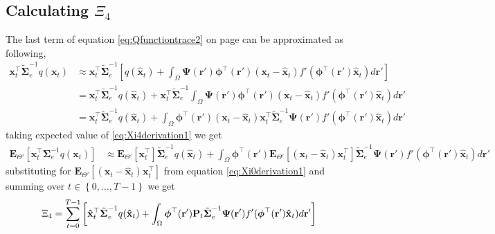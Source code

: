 \documentclass[]{article}
\begin{document}
\subsection*{Calculating $\Xi_{4}$}
The last term of equation \ref{eq:Qfunctiontrace2} on page \pageref{eq:Qfunctiontrace2} can be approximated as following, 
\begin{align}\label{eq:Xi4derivation1}
 \mathbf x_t^\top\tilde{\boldsymbol\Sigma}_e^{-1}q(\mathbf x_t)&\approx\mathbf x_t^\top\tilde{\boldsymbol\Sigma}_e^{-1}\left[q(\mathbf {\hat x}_t)+\int_\Omega \boldsymbol{\Psi}(\mathbf{r}')\boldsymbol \phi^\top(\mathbf r') (\mathbf x_t - \mathbf  {\hat x}_t)f'(\boldsymbol \phi^\top(\mathbf r')\mathbf {\hat x}_t) d\mathbf{r}'\right] \nonumber\\
&=\mathbf x_t^\top\tilde{\boldsymbol\Sigma}_e^{-1}q(\mathbf {\hat x}_t)+\mathbf x_t^\top\tilde{\boldsymbol\Sigma}_e^{-1}\int_\Omega \boldsymbol{\Psi}(\mathbf{r}')\boldsymbol \phi^\top(\mathbf r') (\mathbf x_t - \mathbf  {\hat x}_t)f'(\boldsymbol \phi^\top(\mathbf r')\mathbf {\hat x}_t) d\mathbf{r}' \nonumber \\
&=\mathbf x_t^\top\tilde{\boldsymbol\Sigma}_e^{-1}q(\mathbf {\hat x}_t)+\int_\Omega \boldsymbol \phi^\top(\mathbf r') (\mathbf x_t - \mathbf  {\hat x}_t)\mathbf x_t^\top\tilde{\boldsymbol\Sigma}_e^{-1}\boldsymbol{\Psi}(\mathbf{r}')f'(\boldsymbol \phi^\top(\mathbf r')\mathbf {\hat x}_t) d\mathbf{r}'
\end{align}
taking expected value of \ref{eq:Xi4derivation1} we get
\begin{align}\label{eq:Xi4derivation2}
\mathbf E_{\Theta'}\left[\mathbf x_t^\top\boldsymbol\Sigma_e^{-1}q(\mathbf x_t)\right]&\approx\mathbf E_{\Theta'}\left[\mathbf x_t^\top\right]\tilde{\boldsymbol\Sigma}_e^{-1}q(\mathbf {\hat x}_t)+\int_\Omega \boldsymbol \phi^\top(\mathbf r') \mathbf E_{\Theta'}\left[(\mathbf x_t - \mathbf  {\hat x}_t)\mathbf x_t^\top\right]\tilde{\boldsymbol\Sigma}_e^{-1}\boldsymbol{\Psi}(\mathbf{r}')f'(\boldsymbol \phi^\top(\mathbf r')\mathbf {\hat x}_t) d\mathbf{r}' 
\end{align}
substituting for $\mathbf E_{\Theta'}\left[(\mathbf x_t - \mathbf  {\hat x}_t)\mathbf x_t^\top\right] $ from equation \ref{eq:Xi0derivation1} and summing over $t \in \left\lbrace 0, \dots, T-1\right\rbrace $ we get
\begin{equation}
\Xi_4=\sum_{t=0}^{T-1}\left[\mathbf{ \hat x}_t^\top\tilde{\boldsymbol\Sigma}_e^{-1}q(\mathbf {\hat x}_t)+\int_\Omega \boldsymbol \phi^\top(\mathbf r') \mathbf P_t\tilde{\boldsymbol\Sigma}_e^{-1}\boldsymbol{\Psi}(\mathbf{r}')f'(\boldsymbol \phi^\top(\mathbf r')\mathbf {\hat x}_t) d\mathbf{r}' \right] \\	
\end{equation}
\end{document}
